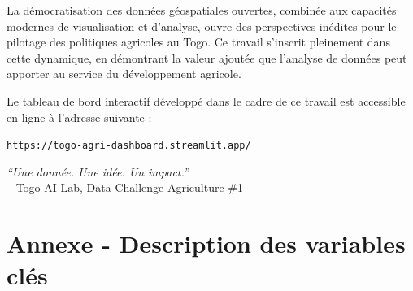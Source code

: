 \documentclass[12pt, a4paper]{article}
\begin{document}
La démocratisation des données géospatiales ouvertes, combinée aux capacités modernes de
visualisation et d'analyse, ouvre des perspectives inédites pour le pilotage des politiques
agricoles au Togo. Ce travail s'inscrit pleinement dans cette dynamique, en démontrant
la valeur ajoutée que l'analyse de données peut apporter au service du développement agricole.

\vspace{0.8cm}

\noindent Le tableau de bord interactif développé dans le cadre de ce travail est accessible en ligne à l'adresse suivante :
\begin{center}
    \href{https://togo-agri-dashboard.streamlit.app/}{\texttt{https://togo-agri-dashboard.streamlit.app/}}
\end{center}

\vspace{1.5cm}

\begin{center}
\textit{``Une donnée. Une idée. Un impact.''}\\[0.3em]
\small -- Togo AI Lab, Data Challenge Agriculture \#1
\end{center}

\appendix
\section{Annexe - Description des variables clés}
\end{document}
